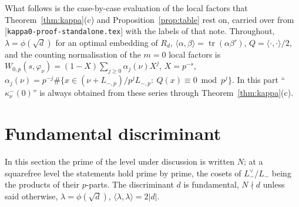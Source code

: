 \documentclass[11pt,reqno]{amsart}
\theoremstyle{plain}
\theoremstyle{definition}
\DeclareMathOperator{\tr}{tr}
\newcommand{\Lm}{L_{-}}
\newcommand{\parentref}[1]{\textup{[#1]}}
\begin{document}
What follows is the case-by-case evaluation of the local factors that Theorem~\ref{thm:kappa}(c)
and Proposition~\ref{prop:table} rest on, carried over from \parentref{\texttt{kappa0-proof-standalone.tex}}
with the labels of that note. Throughout, $\lambda=\phi(\sqrt d)$ for an optimal embedding of
$R_d$, $\langle\alpha,\beta\rangle=\tr(\alpha\beta')$, $Q=\langle\cdot,\cdot\rangle/2$, and the
counting normalisation of the $m=0$ local factors is $W_{0,p}(s,\varphi_\nu)=(1-X)\sum_{j\ge0}
\alpha_j(\nu)X^j$, $X=p^{-s}$, $\alpha_j(\nu)=p^{-j}\#\{x\in(\nu+L_{-,p})/p^jL_{-,p}:\ Q(x)\equiv
0\bmod p^j\}$. In this part ``$\kappa^-_\nu(0)$'' is always obtained from these series through
Theorem~\ref{thm:kappa}(c).

\section{Fundamental discriminant}
In this section the prime of the level under discussion is written $N$; at a squarefree level the statements hold prime by prime, the cosets of $\Lm^\vee/\Lm$ being the products of their $p$-parts. The discriminant $d$ is fundamental, $N\nmid d$ unless said otherwise, $\lambda=\phi(\sqrt d)$, $\langle\lambda,\lambda\rangle=2|d|$.
\end{document}
